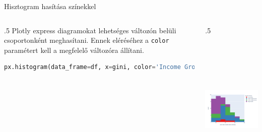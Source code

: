 \documentclass[english, aspectratio=169]{beamer}
\begin{document}
	\begin{frame}[fragile]{Hisztogram hasítása színekkel}
		\begin{columns}
			\begin{column}{.5\textwidth}
				Plotly express diagramokat lehetséges változón belüli csoportonként meghasítani. Ennek eléréséhez a \texttt{color} paramétert kell a megfelelő változóra állítani.\par\medskip
				\begin{lstlisting}[language=python]
px.histogram(data_frame=df, x=gini, color='Income Group', color_discrete_sequence=px.colors.qualitative.Set1)
				\end{lstlisting}
			\end{column}
			\begin{column}{.5\textwidth}
				\begin{center}
					\includegraphics[width=7cm, height=7cm, keepaspectratio]{images/freq_5.png}
				\end{center}
			\end{column}
		\end{columns}
	\end{frame}
	
\end{document}
